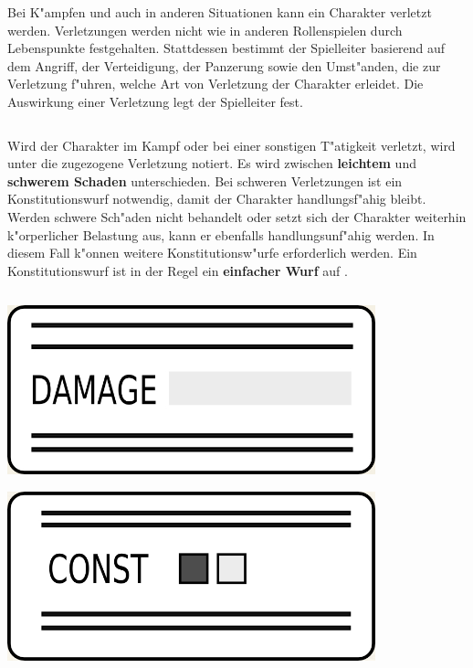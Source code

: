 Bei K"ampfen und auch in anderen Situationen kann ein Charakter verletzt werden. Verletzungen werden nicht wie in anderen Rollenspielen durch Lebenspunkte festgehalten. Stattdessen bestimmt der Spielleiter basierend auf dem Angriff, der Verteidigung, der Panzerung sowie den Umst"anden, die zur Verletzung f"uhren, welche Art von Verletzung der Charakter erleidet. Die Auswirkung einer Verletzung legt der Spielleiter fest.

\begin{column}[l]{0.58}
    Wird der Charakter im Kampf oder bei einer sonstigen T"atigkeit verletzt, wird unter  die zugezogene Verletzung notiert. Es wird zwischen \textbf{leichtem} und \textbf{schwerem Schaden} unterschieden. Bei schweren Verletzungen ist ein Konstitutionswurf notwendig, damit der Charakter handlungsf"ahig bleibt. Werden schwere Sch"aden nicht behandelt oder setzt sich der Charakter weiterhin k"orperlicher Belastung aus, kann er ebenfalls handlungsunf"ahig werden. In diesem Fall k"onnen weitere Konstitutionsw"urfe erforderlich werden. Ein Konstitutionswurf ist in der Regel ein \textbf{einfacher Wurf} auf .
\end{column}
\begin{column}[r]{0.42}
    \centering
    \includegraphics[width=0.80\textwidth]{images/character_damage.jpg}

    \includegraphics[width=0.80\textwidth]{images/character_const.jpg}
\end{column}
\smallskip

